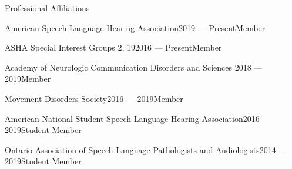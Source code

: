 \documentclass{resume} %
\begin{document}
\begin{rSection}{Professional Affiliations}
	\begin{rSubsection}{American Speech-Language-Hearing Association}{2019 --- Present}{Member}{}
	\end{rSubsection}
	\begin{rSubsection}{ASHA Special Interest Groups 2, 19}{2016 --- Present}{Member}{}
	\end{rSubsection}
	\begin{rSubsection}{Academy of Neurologic Communication Disorders and Sciences }{2018 --- 2019}{Member}{}
	\end{rSubsection}
	\begin{rSubsection}{Movement Disorders Society}{2016 --- 2019}{Member}{}
	\end{rSubsection}
	\begin{rSubsection}{American National Student Speech-Language-Hearing Association}{2016 --- 2019}{Student Member}{}
	\end{rSubsection}
	\begin{rSubsection}{Ontario Association of Speech-Language Pathologists and Audiologists}{2014 --- 2019}{Student Member}{}
	\end{rSubsection}


\end{rSection}

\end{document}

